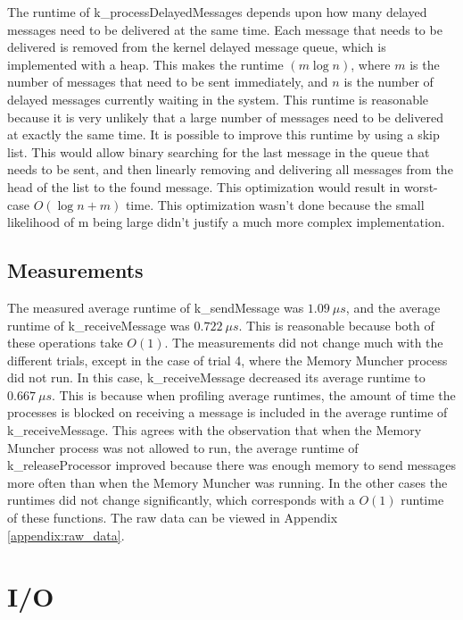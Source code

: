 \documentclass[12pt]{report}
\begin{document}
    The runtime of k\_processDelayedMessages depends upon how many delayed
    messages  need to be delivered at the same time. Each message that needs to
    be delivered  is removed from the kernel delayed message queue, which is
    implemented  with a heap. This makes  the runtime $(m \log n)$, where $m$ is
    the number of messages that need to be sent immediately, and $n$ is the
    number of delayed messages currently waiting in the system. This runtime is
    reasonable because it is very unlikely that a large number of messages need
    to be delivered at exactly the same time. It is possible to improve this
    runtime by using a skip list. This would allow binary searching for the last
    message in the queue that needs to be sent, and then linearly removing and
    delivering all messages  from the head of the list to the found message.
    This optimization would result  in worst-case $O(\log n + m)$ time. This
    optimization wasn't done because the  small likelihood of m being large
    didn't justify a much more complex implementation.

\section{Measurements}
    
    The measured average runtime of k\_sendMessage was $1.09 \: \mu s$, and the average 
    runtime of k\_receiveMessage was $0.722 \: \mu s$. This is reasonable because both 
    of these operations take $O(1)$. The measurements did not change much with the 
    different trials, except in the case of trial 4, where the Memory Muncher process 
    did not run. In this case, k\_receiveMessage decreased its average runtime to 
    $0.667 \: \mu s$. This is because when profiling average runtimes, the amount of 
    time the processes is blocked on receiving a message is included in the average runtime 
    of k\_receiveMessage. This agrees with the observation that when the Memory Muncher 
    process was not allowed to run, the average runtime of k\_releaseProcessor improved 
    because there was enough memory to send messages more often than when the Memory 
    Muncher was running. In the other cases the runtimes did not change significantly, 
    which corresponds with a $O(1)$ runtime of these functions. The raw data can 
    be viewed in Appendix \ref{appendix:raw_data}.

\chapter{I/O}
\end{document}
